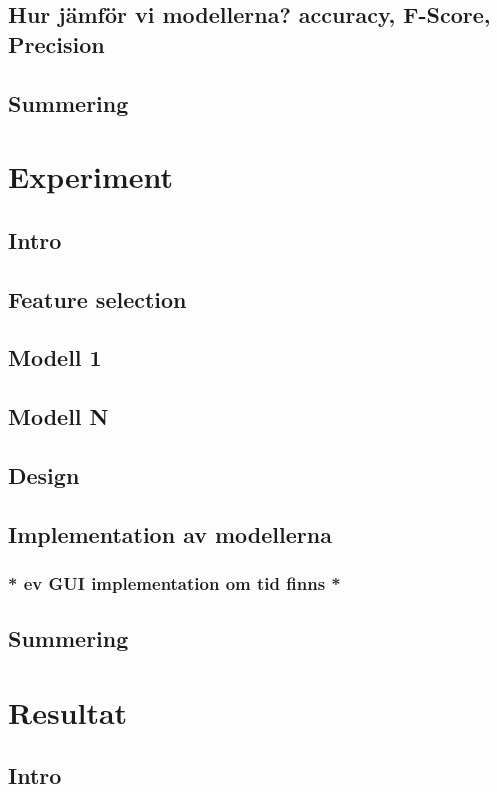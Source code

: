 \documentclass{kaumasters} %
\begin{document}
\section{Hur jämför vi modellerna? accuracy, F-Score, Precision}
\section{Summering}

\newpage

\chapter{Experiment}
\section{Intro}
\section{Feature selection}
\section{Modell 1}
\section{Modell N}
\section{Design}
\section{Implementation av modellerna}
\subsection{* ev GUI implementation om tid finns *}
\section{Summering}


\newpage

\chapter{Resultat}
\section{Intro}
\end{document}
